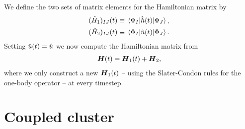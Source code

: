             We define the two sets of matrix elements for the Hamiltonian matrix
            by
            \begin{gather}
                (\hat{H}_1)_{IJ}(t)
                \equiv
                \mel{\Phi_I}{\hat{h}(t)}{\Phi_J}, \\
                (\hat{H}_2)_{IJ}(t)
                \equiv
                \mel{\Phi_I}{\hat{u}(t)}{\Phi_J}.
            \end{gather}
            Setting $\hat{u}(t) = \hat{u}$ we now compute the Hamiltonian
            matrix from
            \begin{align}
                \boldsymbol{H}(t)
                = \boldsymbol{H}_1(t) + \boldsymbol{H}_2,
            \end{align}
            where we only construct a new $\boldsymbol{H}_1(t)$ -- using the
            Slater-Condon rules for the one-body operator -- at every timestep.

    \section{Coupled cluster}
